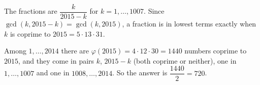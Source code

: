 The fractions are $\dfrac{k}{2015-k}$ for $k=1,\dots,1007$. Since $\gcd(k,2015-k)=\gcd(k,2015)$, a fraction is in lowest terms exactly when $k$ is coprime to $2015=5\cdot13\cdot31$.

Among $1,\dots,2014$ there are $\varphi(2015)=4\cdot12\cdot30=1440$ numbers coprime to $2015$, and they come in pairs $k$, $2015-k$ (both coprime or neither), one in $1,\dots,1007$ and one in $1008,\dots,2014$. So the answer is $\dfrac{1440}{2}=\boxed{720}$.
